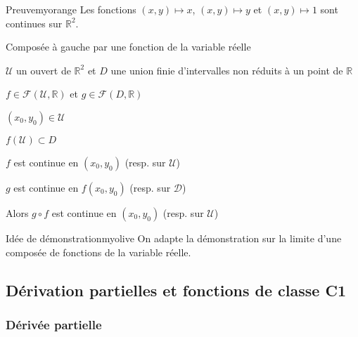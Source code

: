     \begin{demo}{Preuve}{myorange}
        Les fonctions $(x,y) \mapsto x$, $(x,y) \mapsto y$ et $(x,y) \mapsto 1$ sont continues sur $\mathbb{R}^2$.
    \end{demo}

    \begin{prop}{Composée à gauche par une fonction de la variable réelle}{}
        \begin{soient}
            \item $\mathcal{U}$ un ouvert de $\mathbb{R}^2$ et $D$ une union finie d’intervalles non réduits à un point de $\mathbb{R}$
            \item $f \in \mathcal{F}(\mathcal{U},\mathbb{R})$ et $g \in \mathcal{F}(D,\mathbb{R})$
            \item $(x_0,y_0) \in \mathcal{U}$
        \end{soient}
        \begin{suppose}
            \item $f(\mathcal{U}) \subset D$
            \item $f$ est continue en $(x_0,y_0)$ (resp. sur $\mathcal{U}$)
            \item $g$ est continue en $f(x_0,y_0)$ (resp. sur $\mathcal{D}$)
        \end{suppose}
        Alors $g \circ f$ est continue en $(x_0,y_0)$ (resp. sur $\mathcal{U}$)
    \end{prop}

    \begin{demo}{Idée de démonstration}{myolive}
        On adapte la démonstration sur la limite d’une composée de fonctions de la variable réelle.
    \end{demo}

\subsection{Dérivation partielles et fonctions de classe C1}

    \subsubsection{Dérivée partielle}

